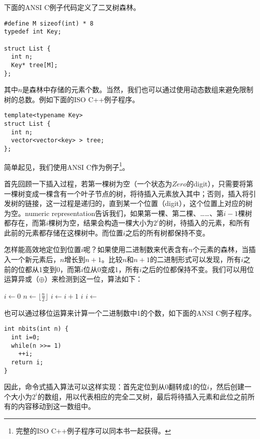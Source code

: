 \documentclass[UTF8]{article}
\begin{document}
下面的ANSI C例子代码定义了二叉树森林。

\lstset{language=C}
\begin{lstlisting}
#define M sizeof(int) * 8
typedef int Key;

struct List {
  int n;
  Key* tree[M];
};
\end{lstlisting}

其中$n$是森林中存储的元素个数。当然，我们也可以通过使用动态数组来避免限制树的总数。例如下面的ISO C++例子程序。

\lstset{language=C++}
\begin{lstlisting}
template<typename Key>
struct List {
  int n;
  vector<vector<key> > tree;
};
\end{lstlisting}

简单起见，我们使用ANSI C作为例子\footnote{完整的ISO C++例子程序可以同本书一起获得。}。

首先回顾一下插入过程，若第一棵树为空（一个状态为$Zero$的digit），只需要将第一棵树变成一棵含有一个叶子节点的树，将待插入元素放入其中；否则，插入将引发树的链接，这一过程是递归的，直到某一个位置（digit），这个位置上对应的树为空。numeric representation告诉我们，如果第一棵、第二棵、……、第$i-1$棵树都存在，而第$i$棵树为空，结果会构造一棵大小为$2^i$的树，待插入的元素，和所有此前的元素都存储在这棵树中。而位置$i$之后的所有树都保持不变。

怎样能高效地定位到位置$i$呢？如果使用二进制数来代表含有$n$个元素的森林，当插入一个新元素后，$n$增长到$n+1$。比较$n$和$n+1$的二进制形式可以发现，所有$i$之前的位都从1变到0，而第$i$位从0变成1，所有$i$之后的位都保持不变。我们可以用位运算异或（$\oplus$）来检测到这一位，算法如下：

\begin{algorithmic}
  \State $i \gets 0$
    \State $ n \gets \lfloor \frac{n}{2} \rfloor$
    \State $ i \gets i + 1$
  \EndWhile
  \State \Return $i$
\EndFunction
\Statex
\State $i \gets $ 
\end{algorithmic}

也可以通过移位运算来计算一个二进制数中1的个数，如下面的ANSI C例子程序。

\begin{lstlisting}
int nbits(int n) {
  int i=0;
  while(n >>= 1)
    ++i;
  return i;
}
\end{lstlisting}

因此，命令式插入算法可以这样实现：首先定位到从0翻转成1的位$i$，然后创建一个大小为$2^i$的数组，用以代表相应的完全二叉树，最后将待插入元素和此位之前所有的内容移动到这一数组中。
\end{document}
